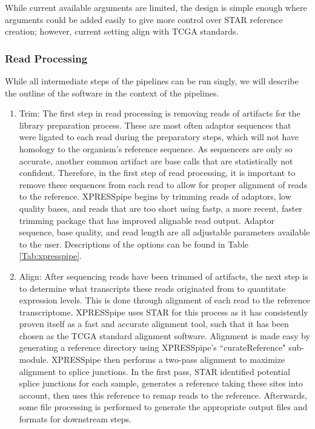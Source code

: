 \documentclass[11pt, a4paper, oneside]{article}
\begin{document}
While current available arguments are limited, the design is simple enough where arguments could be added easily to give more control over STAR reference creation; however, current setting align with TCGA standards.

\subsubsection{Read Processing}
While all intermediate steps of the pipelines can be run singly, we will describe the outline of the software in the context of the pipelines.

\begin{enumerate}
  \item Trim: The first step in read processing is removing reads of artifacts for the library preparation process. These are most often adaptor sequences that were ligated to each read during the preparatory steps, which will not have homology to the organism's reference sequence. As sequencers are only so accurate, another common artifact are base calls that are statistically not confident. Therefore, in the first step of read processing, it is important to remove these sequences from each read to allow for proper alignment of reads to the reference. XPRESSpipe begins by trimming reads of adaptors, low quality bases, and reads that are too short using fastp, a more recent, faster trimming package that has improved alignable read output{}. Adaptor sequence, base quality, and read length are all adjustable parameters available to the user. Descriptions of the options can be found in Table \ref{Tab:xpresspipe}.
  \item Align: After sequencing reads have been trimmed of artifacts, the next step is to determine what transcripts these reads originated from to quantitate expression levels. This is done through alignment of each read to the reference transcriptome. XPRESSpipe uses STAR{} for this process as it has consistently proven itself as a fast and accurate alignment tool{}, such that it has been chosen as the TCGA standard alignment software. Alignment is made easy by generating a reference directory using XPRESSpipe's ``curateReference" sub-module. XPRESSpipe then performs a two-pass alignment to maximize alignment to splice junctions. In the first pass, STAR identified potential splice junctions for each sample, generates a reference taking these sites into account, then uses this reference to remap reads to the reference. Afterwards, some file processing is performed to generate the appropriate output files and formats for downstream steps.

\end{enumerate}
\end{document}
